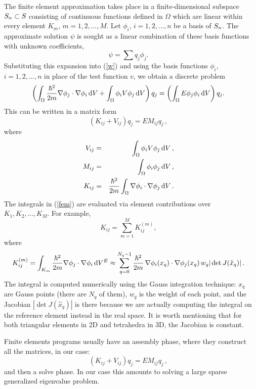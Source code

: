 The finite element approximation takes place in a finite-dimensional subspace $S_n \subset \S$ 
consisting of continuous functions defined in $\Omega$ which are linear within every element $K_m$,
$m = 1, 2, \ldots, M$.
Let $\phi_i$, $i = 1, 2, \ldots, n$ be a basis of $\S_n$. The approximate solution 
$\psi$ is sought as a linear combination of these basis functions with 
unknown coefficients,
$$
\psi=\sum q_j\phi_j.
$$
Substituting this expansion into (\ref{w}) and using the basis functions 
$\phi_i$, $i = 1, 2, \ldots, n$ in place of the test function $v$, we
obtain a discrete problem
\begin{equation}
  \left(\int_{\Omega}{\hbar^2\over2m}\nabla\phi_j\cdot\nabla\phi_i\,\d V+
\int_{\Omega}\phi_iV\phi_j\,\d V\right)q_j = \left(\int_{\Omega} E\phi_j\phi_i\,\d
V\right)q_j.
\label{fem}
\end{equation}
This can be written in a matrix form
$$
  \left(K_{ij}+V_{ij}\right)q_j=EM_{ij}q_j\,,
$$
where
\begin{eqnarray*}
V_{ij}&=&\int_{\Omega}\phi_iV\phi_j\,\d V\,, \\
M_{ij}&=&\int_{\Omega}\phi_i\phi_j\,\d V\,, \\
K_{ij}&=&{\hbar^2\over2m}\int_{\Omega}\nabla\phi_i\cdot\nabla\phi_j\,\d V\,.
\end{eqnarray*}
The integrals in (\ref{fem}) are evaluated via element contributions 
over $K_1, K_2, \ldots, K_M$. For example,
$$
  K_{ij}=\sum_{m=1}^M K_{ij}^{(m)},
$$
where 
$$
  K_{ij}^{(m)}=\int_{K_m}{\hbar^2\over2m}\nabla\phi_j\cdot\nabla\phi_i\,\d
V^{E}\approx \sum_{q=0}^{N_q-1}{\hbar^2\over2m}\,\nabla\phi_i(x_q)\cdot\nabla\phi_j(x_q)\,
w_q|\det J(\hat x_q)|\,.
$$
The integral is computed numerically using the Gauss integration
technique: $x_q$
are Gauss points (there are $N_q$ of them), $w_q$ is the weight of
each point, and the Jacobian $|\det J(\hat x_q)|$ is there because we
are actually computing the integral on the reference element instead
in the real space. It is worth mentioning that for both triangular 
elements in 2D and tetrahedra in 3D, the Jacobian is constant.


Finite elements programs usually have an assembly phase, where they
construct all the matrices, in our case:
$$
  \left(K_{ij}+V_{ij}\right)q_j=EM_{ij}q_j\,,
$$
and then a solve phase. In our case this amounts to solving a large sparse
generalized eigenvalue problem.
